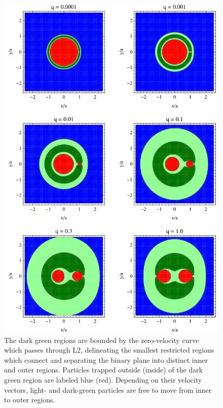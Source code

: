 \begin{figure}
\begin{center}
\includegraphics[scale=0.56]{figures/ch2/Excluded_Regions_q_vVirial_DarkGreen}
\end{center}
\caption{The dark green regions are bounded by the zero-velocity curve
  which passes through L2, delineating the smallest restricted regions
  which connect and separating the binary plane into distinct inner
  and outer regions. Particles trapped outside (inside) of the dark
  green region are labeled blue (red). Depending on their velocity
  vectors, light- and dark-green particles are free to move from inner
  to outer regions. }
\label{Fig:CJAddV}
\end{figure}



